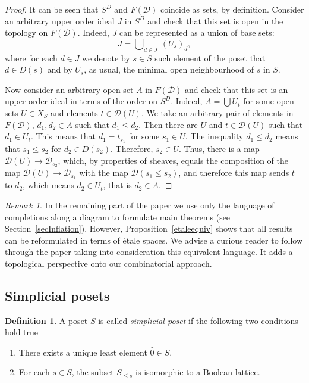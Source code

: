 \documentclass[english,12pt,oneside]{amsproc}
\newcommand{\ca}[1]{\mathcal{#1}}
\newcounter{stmcounter}[section]
\numberwithin{equation}{section}
\theoremstyle{plain}
\theoremstyle{definition}
\newtheorem{defin}[stmcounter]{Definition}
\theoremstyle{remark}
\newtheorem{rem}[stmcounter]{Remark}
\begin{document}
\begin{proof}
It can be seen that $S^D$ and $F(\ca{D})$ coincide as sets, by definition. Consider an arbitrary upper order ideal $J$ in $S^D$ and check that this set is open in the topology on $F(\ca{D})$. Indeed, $J$ can be represented as a union of base sets:
\[
J = \bigcup\nolimits_{d\in J}\: (U_s)_d,
\]
where for each $d\in J$ we denote by $s\in S$ such element of the poset that $d\in D(s)$ and by $U_s$, as usual, the minimal open neighbourhood of $s$ in $S$.

Now consider an arbitrary open set $A$ in $F(\ca{D})$ and check that this set is an upper order ideal in terms of the order on $S^D$. Indeed, $A = \bigcup\nolimits U_t$ for some open sets $U\in X_S$ and elements $t\in \ca{D}(U)$. We take an arbitrary pair of elements in $F(\ca{D})$, $d_1,d_2\in A$ such that $d_1\leq d_2$. Then there are $U$ and $t\in \ca{D}(U)$ such that $d_1\in U_t$. This means that $d_1 = t_{s_1}$ for some $s_1\in U$. The inequality $d_1\leq d_2$ means that $s_1\leq s_2$ for $d_2\in D(s_2)$. Therefore, $s_2\in U$. Thus, there is a map $\ca{D}(U)\to \ca{D}_{s_2}$, which, by properties of sheaves, equals the composition of the map $\ca{D}(U)\to \ca{D}_{s_1}$ with the map $\ca{D}(s_1\leq s_2)$, and therefore this map sends $t$ to $d_2$, which means $d_2\in U_t$, that is $d_2\in A$.
\end{proof}

\begin{rem}
In the remaining part of the paper we use only the language of completions along a diagram to formulate main theorems (see Section~\ref{secInflation}). However, Proposition~\ref{etaleequiv} shows that all results can be reformulated in terms of étale spaces. We advise a curious reader to follow through the paper taking into consideration this equivalent language. It adds a topological perspective onto our combinatorial approach.
\end{rem}

\subsection{Simplicial posets}\label{subsecSimpPosets}

\begin{defin}\label{definSimpPoset}
A poset $S$ is called \emph{simplicial poset} if the following two conditions hold true
\begin{enumerate}
  \item There exists a unique least element $\hat{0}\in S$.
  \item For each $s\in S$, the subset $S_{\leqslant s}$ is isomorphic to a Boolean lattice.
\end{enumerate}
\end{defin}
\end{document}
